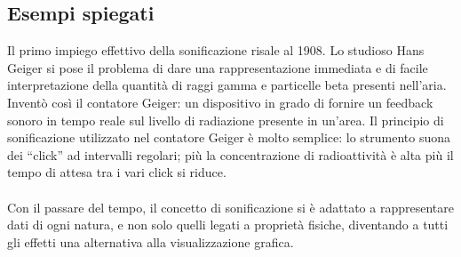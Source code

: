 \subsection{Esempi spiegati}
Il primo impiego effettivo della sonificazione risale al 1908. Lo studioso Hans Geiger si pose il problema di dare una rappresentazione immediata e di facile interpretazione della quantità di raggi gamma e particelle beta presenti nell’aria.
Inventò così il contatore Geiger: un dispositivo in grado di fornire un feedback sonoro in tempo reale sul livello di radiazione presente in un’area.
Il principio di sonificazione utilizzato nel contatore Geiger è molto semplice: lo strumento suona dei “click” ad intervalli regolari; più la concentrazione di radioattività è alta più il tempo di attesa tra i vari click si riduce.
\\\\
Con il passare del tempo, il concetto di sonificazione si è adattato a rappresentare dati di ogni natura, e non solo quelli legati a proprietà fisiche, diventando a tutti gli effetti una alternativa alla visualizzazione grafica.

